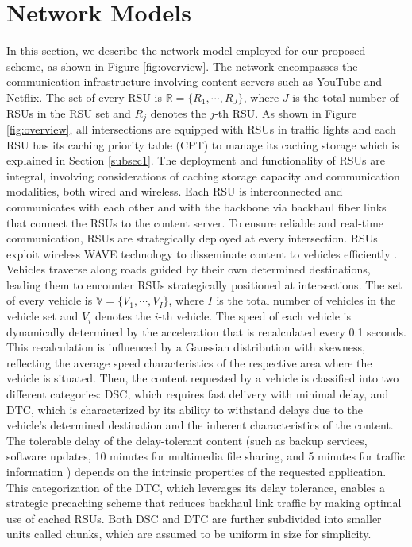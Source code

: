 \documentclass[journal]{IEEEtran}
\begin{document}
\section{Network Models} \label{sec.nm}
In this section, we describe the network model employed for our proposed scheme, as shown in Figure \ref{fig:overview}.
The network encompasses the communication infrastructure involving content servers such as YouTube and Netflix.
The set of every RSU is $\mathbb{R}=\{R_{1}, \cdots, R_{J}\}$, where $J$ is the total number of RSUs in the RSU set and $R_{j}$ denotes the $j$-th RSU.
As shown in Figure \ref{fig:overview}, all intersections are equipped with RSUs in traffic lights and each RSU has its caching priority table (CPT) to manage its caching storage which is explained in Section \ref{subsec1}.
The deployment and functionality of RSUs are integral, involving considerations of caching storage capacity and communication modalities, both wired and wireless.
Each RSU is interconnected and communicates with each other and with the backbone via backhaul fiber links that connect the RSUs to the content server.
To ensure reliable and real-time communication, RSUs are strategically deployed at every intersection.
RSUs exploit wireless WAVE technology to disseminate content to vehicles efficiently \cite{WAVE}.
Vehicles traverse along roads guided by their own determined destinations, leading them to encounter RSUs strategically positioned at intersections.
The set of every vehicle is $\mathbb{V}=\{V_{1}, \cdots, V_{I}\}$, where $I$ is the total number of vehicles in the vehicle set and $V_{i}$ denotes the $i$-th vehicle.
The speed of each vehicle is dynamically determined by the acceleration that is recalculated every 0.1 seconds.
This recalculation is influenced by a Gaussian distribution with skewness, reflecting the average speed characteristics of the respective area where the vehicle is situated.
Then, the content requested by a vehicle is classified into two different categories: DSC, which requires fast delivery with minimal delay, and DTC, which is characterized by its ability to withstand delays due to the vehicle's determined destination and the inherent characteristics of the content.
The tolerable delay of the delay-tolerant content (such as backup services, software updates, 10 minutes for multimedia file sharing, and 5 minutes for traffic information \cite{Lee2014, Chen2009}) depends on the intrinsic properties of the requested application.
This categorization of the DTC, which leverages its delay tolerance, enables a strategic precaching scheme that reduces backhaul link traffic by making optimal use of cached RSUs.
Both DSC and DTC are further subdivided into smaller units called chunks, which are assumed to be uniform in size for simplicity.
\end{document}
